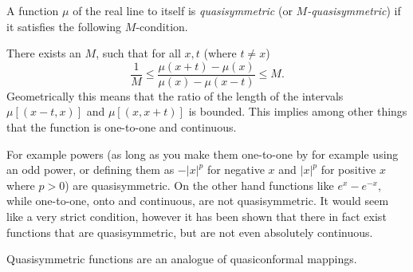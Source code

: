 \documentclass[12pt]{article}
\begin{document}
A function $\mu$ of the real line to itself is \emph{quasisymmetric} (or \emph{$M$-quasisymmetric}) if it satisfies the following $M$-condition. 

There exists an $M$, such that for all $x, t$ (where $t \not= x$)
\begin{equation*}
\frac{1}{M}
\leq
\frac{\mu(x+t) - \mu(x)}{\mu(x)-\mu(x-t)}
\leq
M
.
\end{equation*}
Geometrically this means that the ratio of the length of the intervals $\mu[(x-t,x)]$ and $\mu[(x,x+t)]$ is bounded.  This implies among other things that the function is one-to-one and continuous.

For example powers (as long as you make them one-to-one by for example using an odd power, or defining them as $-|x|^p$ for negative $x$ and $|x|^p$ for positive $x$ where $p > 0$) are quasisymmetric.  On the other hand functions like $e^x - e^{-x}$, while one-to-one, onto and continuous, are not quasisymmetric.  It would seem like a very strict condition, however it has been shown that there in fact exist functions that are quasisymmetric, but are not even absolutely continuous.

Quasisymmetric functions are an analogue of quasiconformal mappings.
\end{document}
